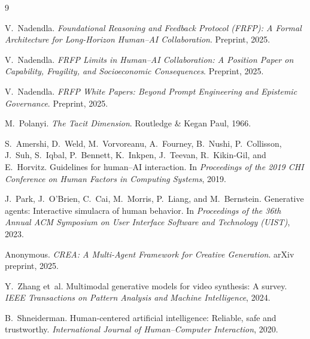 \documentclass[preprints,article,submit,pdftex,moreauthors,accept]{Definitions/mdpi}
\begin{document}

\begin{thebibliography}{9}

V.~Nadendla.
\newblock \emph{Foundational Reasoning and Feedback Protocol (FRFP): A Formal Architecture for Long-Horizon Human--AI Collaboration}.
\newblock Preprint, 2025.

V.~Nadendla.
\newblock \emph{FRFP Limits in Human--AI Collaboration: A Position Paper on Capability, Fragility, and Socioeconomic Consequences}.
\newblock Preprint, 2025.

V.~Nadendla.
\newblock \emph{FRFP White Papers: Beyond Prompt Engineering and Epistemic Governance}.
\newblock Preprint, 2025.

M.~Polanyi.
\newblock \emph{The Tacit Dimension}.
\newblock Routledge \& Kegan Paul, 1966.

S.~Amershi, D.~Weld, M.~Vorvoreanu, A.~Fourney, B.~Nushi, P.~Collisson, J.~Suh, S.~Iqbal, P.~Bennett, K.~Inkpen, J.~Teevan, R.~Kikin-Gil, and E.~Horvitz.
\newblock Guidelines for human--AI interaction.
\newblock In \emph{Proceedings of the 2019 CHI Conference on Human Factors in Computing Systems}, 2019.

J.~Park, J.~O’Brien, C.~Cai, M.~Morris, P.~Liang, and M.~Bernstein.
\newblock Generative agents: Interactive simulacra of human behavior.
\newblock In \emph{Proceedings of the 36th Annual ACM Symposium on User Interface Software and Technology (UIST)}, 2023.

Anonymous.
\newblock \emph{CREA: A Multi-Agent Framework for Creative Generation}.
\newblock arXiv preprint, 2025.

Y.~Zhang et~al.
\newblock Multimodal generative models for video synthesis: A survey.
\newblock \emph{IEEE Transactions on Pattern Analysis and Machine Intelligence}, 2024.

B.~Shneiderman.
\newblock Human-centered artificial intelligence: Reliable, safe and trustworthy.
\newblock \emph{International Journal of Human--Computer Interaction}, 2020.

\end{thebibliography}
\end{document}
